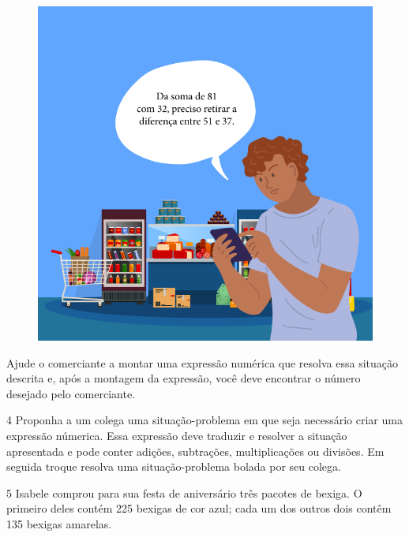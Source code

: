 \begin{figure}[htpb!]
\centering
\includegraphics[width=\textwidth]{../ilustracoes/MAT5/SAEB_5ANO_MAT_figura91.png}
\end{figure}

Ajude o comerciante a montar uma expressão numérica que resolva
essa situação descrita e, após a montagem da expressão, você deve
encontrar o número desejado pelo comerciante.


\pagebreak

\num{4} Proponha a um colega uma situação-problema em que seja necessário
criar uma expressão númerica. Essa expressão deve traduzir e resolver a
situação apresentada e pode conter adições, subtrações, multiplicações 
ou divisões. Em seguida troque resolva uma situação-problema bolada por 
seu colega.

\bigskip
\bigskip
\bigskip
\bigskip
\bigskip
\bigskip
\bigskip
\bigskip

\num{5} Isabele comprou para sua festa de aniversário três pacotes de
bexiga. O primeiro deles contém 225 bexigas de cor azul; cada um dos
outros dois contêm 135 bexigas amarelas.

